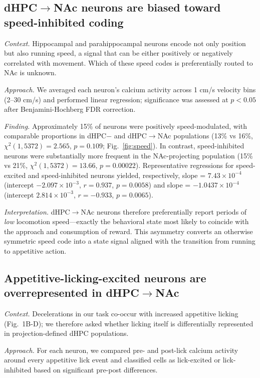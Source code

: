 \documentclass[11pt]{article}
\begin{document}
\subsection{dHPC$\rightarrow$NAc neurons are biased toward speed-inhibited coding}

\textit{Context.} Hippocampal and parahippocampal neurons encode not only position but also running speed, a signal that can be either positively or negatively correlated with movement. Which of these speed codes is preferentially routed to NAc is unknown.

\textit{Approach.} We averaged each neuron's calcium activity across 1 cm/s velocity bins (2--30 cm/s) and performed linear regression; significance was assessed at $p<0.05$ after Benjamini-Hochberg FDR correction.

\textit{Finding.} Approximately 15\% of neurons were positively speed-modulated, with comparable proportions in dHPC$-$ and dHPC$\rightarrow$NAc populations (13\% vs 16\%, $\chi^2(1,5372)=2.565$, $p=0.109$; Fig.~\ref{fig:speed}). In contrast, speed-inhibited neurons were substantially more frequent in the NAc-projecting population (15\% vs 21\%, $\chi^2(1,5372)=13.66$, $p=0.00022$). Representative regressions for speed-excited and speed-inhibited neurons yielded, respectively, slope = $7.43\times10^{-4}$ (intercept $-2.097\times10^{-3}$, $r=0.937$, $p=0.0058$) and slope = $-1.0437\times10^{-4}$ (intercept $2.814\times10^{-3}$, $r=-0.933$, $p=0.0065$).

\textit{Interpretation.} dHPC$\rightarrow$NAc neurons therefore preferentially report periods of \emph{low} locomotion speed---exactly the behavioral state most likely to coincide with the approach and consumption of reward. This asymmetry converts an otherwise symmetric speed code into a state signal aligned with the transition from running to appetitive action.

\subsection{Appetitive-licking-excited neurons are overrepresented in dHPC$\rightarrow$NAc}

\textit{Context.} Decelerations in our task co-occur with increased appetitive licking (Fig.~1B-D); we therefore asked whether licking itself is differentially represented in projection-defined dHPC populations.

\textit{Approach.} For each neuron, we compared pre- and post-lick calcium activity around every appetitive lick event and classified cells as lick-excited or lick-inhibited based on significant pre-post differences.
\end{document}
